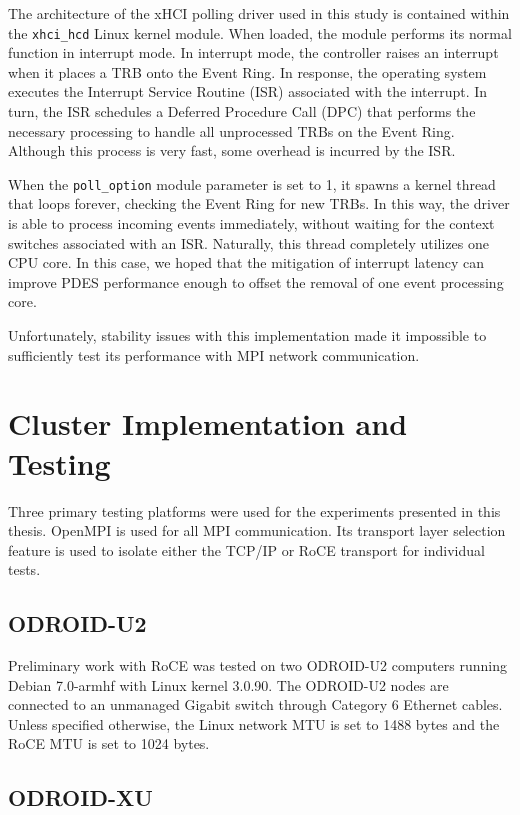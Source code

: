 \documentclass[11pt]{book}
\begin{document}
The architecture of the xHCI polling driver used in this study is contained
within the \verb;xhci_hcd; Linux kernel module. When loaded, the module performs
its normal function in interrupt mode. In interrupt mode, the controller raises
an interrupt when it places a TRB onto the Event Ring. In response, the
operating system executes the Interrupt Service Routine (ISR) associated with the
interrupt. In turn, the ISR schedules a Deferred Procedure Call (DPC) that
performs the necessary processing to handle all unprocessed TRBs on the Event
Ring. Although this process is very fast, some overhead is incurred by the ISR.

When the \verb;poll_option; module parameter is set to 1, it spawns a kernel
thread that loops forever, checking the Event Ring for new TRBs. In this way,
the driver is able to process incoming events immediately, without waiting for
the context switches associated with an ISR. Naturally, this thread completely
utilizes one CPU core. In this case, we hoped that the mitigation of interrupt
latency can improve PDES performance enough to offset the removal of one event
processing core.

Unfortunately, stability issues with this implementation made it impossible to
sufficiently test its performance with MPI network communication.

\newpage
\chapter{Cluster Implementation and Testing}
\label{cluster}

Three primary testing platforms were used for the experiments presented in this
thesis. OpenMPI is used for all MPI communication. Its transport layer selection
feature is used to isolate either the TCP/IP or RoCE transport for individual
tests.

\section{\textbf{ODROID-U2}}

Preliminary work with RoCE was tested on two ODROID-U2 computers running Debian
7.0-armhf with Linux kernel 3.0.90. The ODROID-U2 nodes are connected to an
unmanaged Gigabit switch through Category 6 Ethernet cables. Unless specified
otherwise, the Linux network MTU is set to 1488 bytes and the RoCE MTU is set to
1024 bytes.

\section{\textbf{ODROID-XU}}
\end{document}
